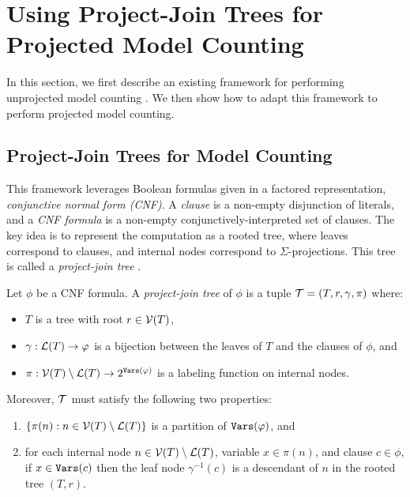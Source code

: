 \section{Using Project-Join Trees for Projected Model Counting}
In this section, we first describe an existing framework for performing unprojected model counting \cite{dudek2020dpmc}. 
We then show how to adapt this framework to perform projected model counting.

\subsection{Project-Join Trees for Model Counting}
\label{sec_ungraded_trees}
This framework leverages Boolean formulas given in a factored representation, \emph{conjunctive normal form (CNF)}.
A \emph{clause} is a non-empty disjunction of literals, and a \emph{CNF formula} is a non-empty conjunctively-interpreted set of clauses.
The key idea is to represent the computation as a rooted tree, where leaves correspond to clauses, and internal nodes correspond to $\Sigma$-projections. 
This tree is called a \emph{project-join tree} \cite{dudek2020dpmc}.
\begin{definition}
\label{def_jointree_old}
    Let $\phi$ be a CNF formula.
    A \emph{project-join tree} of $\phi$ is a tuple $\mathcal{T} = (T, r, \gamma, \pi)$ where:
    \begin{itemize}
        \item $T$ is a tree with root $r \in \mathcal{V}(T)$,
        \item $\gamma: \mathcal{L}(T) \to \varphi$ is a bijection between the leaves of $T$ and the clauses of $\phi$, and
        \item $\pi: \mathcal{V}(T) \setminus \mathcal{L}(T) \to 2^{\texttt{\upshape Vars}(\varphi)}$ is a labeling function on internal nodes.
    \end{itemize}
    Moreover, $\mathcal{T}$ must satisfy the following two properties:
    \begin{enumerate}[ref=\arabic*]
        \item \label{prop_jointree_1} $\{\pi(n) : n \in \mathcal{V}(T) \setminus \mathcal{L}(T) \}$ is a partition of $\texttt{\upshape Vars}(\varphi)$, and
        \item \label{prop_jointree_2} for each internal node $n \in \mathcal{V}(T) \setminus \mathcal{L}(T)$, variable $x \in \pi(n)$, and clause $c \in \phi$, if $x \in \texttt{\upshape Vars}(c)$ then the leaf node $\gamma^{-1}(c)$ is a descendant of $n$ in the rooted tree $(T, r)$.
    \end{enumerate}
\end{definition}

